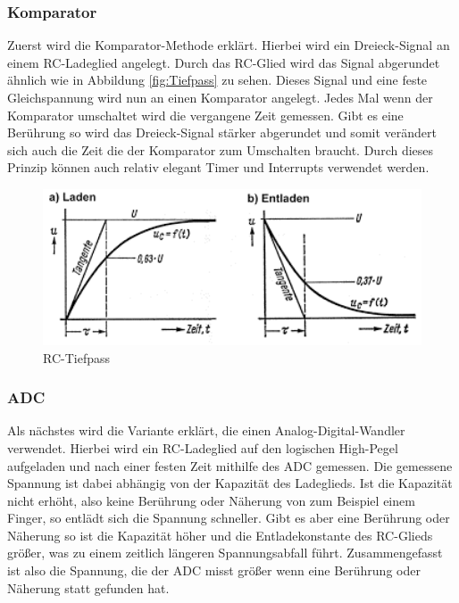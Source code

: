 \documentclass[a4paper,
DIV=13,
12pt,
BCOR=10mm,
department=FakEI,
parskip=half,
automark,
]{article}
\begin{document}
\subsubsection{Komparator}
Zuerst wird die Komparator-Methode erklärt. Hierbei wird ein Dreieck-Signal an einem RC-Ladeglied angelegt. Durch das RC-Glied wird das Signal abgerundet ähnlich wie in Abbildung \ref{fig:Tiefpass} zu sehen. Dieses Signal und eine feste Gleichspannung wird nun an einen Komparator angelegt. Jedes Mal wenn der Komparator umschaltet wird die vergangene Zeit gemessen. Gibt es eine Berührung so wird das Dreieck-Signal stärker abgerundet und somit verändert sich auch die Zeit die der Komparator zum Umschalten braucht. Durch dieses Prinzip können auch relativ elegant Timer und Interrupts verwendet werden. 
\begin{figure}[!hbpt]
 \begin{center} \includegraphics[width=1\textwidth]{RCTiefpass.png}
 \caption{RC-Tiefpass}
 \label{fig:Tiefpass \ref{RCTiefpass}}
  \end{center}
\end{figure}

\subsubsection{ADC}
Als nächstes wird die Variante erklärt, die einen Analog-Digital-Wandler verwendet. Hierbei wird ein RC-Ladeglied auf den logischen High-Pegel aufgeladen und nach einer festen Zeit mithilfe des ADC gemessen. Die gemessene Spannung ist dabei abhängig von der Kapazität des Ladeglieds. Ist die Kapazität nicht erhöht, also keine Berührung oder Näherung von zum Beispiel einem Finger, so entlädt sich die Spannung schneller. Gibt es aber eine Berührung oder Näherung so ist die Kapazität höher und die Entladekonstante des RC-Glieds größer, was zu einem zeitlich längeren Spannungsabfall führt. Zusammengefasst ist also die Spannung, die der ADC misst größer wenn eine Berührung oder Näherung statt gefunden hat. 
\end{document}
